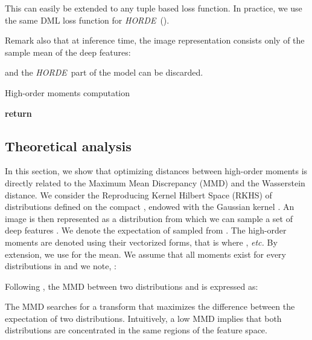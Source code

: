 \documentclass[10pt,twocolumn,letterpaper]{article}
\def\ourmethod{\textit{HORDE}}
\begin{document}
        This can easily be extended to any tuple based loss function.
        In practice, we use the same DML loss function for \ourmethod \ ().
        
        Remark also that at inference time, the image representation  consists only of the sample mean of the deep features:
        
        and the \ourmethod \ part of the model can be discarded.
        
        \begin{algorithm}[t]
            \caption{High-order moments computation}\label{algo:horde}
            \begin{algorithmic}[1]
                \State 
                \State 
                \While{}
                    \State 
                    \State 
                \EndWhile
                \State \textbf{return} 
                \EndProcedure
            \end{algorithmic}
        \end{algorithm}
    
    \subsection{Theoretical analysis}\label{sec:met_theory}
        In this section, we show that optimizing distances between high-order moments is directly related to the Maximum Mean Discrepancy (MMD) \cite{Gretton_2007_NIPS} and the Wasserstein distance.
        We consider the Reproducing Kernel Hilbert Space (RKHS)  of distributions  defined on the compact , endowed with the Gaussian kernel .
        An image is then represented as a distribution  from which we can sample a set of deep features .
        We denote  the expectation of  sampled from .
        The high-order moments are denoted using their vectorized forms, that is  where , \emph{etc.}
        By extension, we use  for the mean.
        We assume that all moments exist for every distributions in  and we note, :
        
        
        Following \cite{Gretton_2007_NIPS}, the MMD between two distributions  and  is expressed as:
        
        The MMD searches for a transform  that maximizes the difference between the expectation of two distributions.
        Intuitively, a low MMD implies that both distributions are concentrated in the same regions of the feature space.
        
\end{document}

